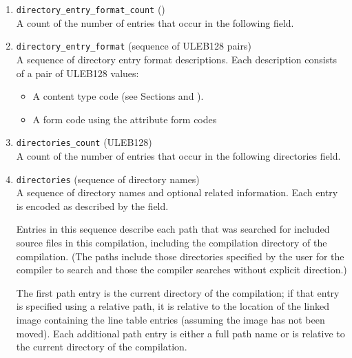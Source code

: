 \begin{enumerate}[1. ]
\setcounter{enumi}{\value{saveenumi}}
\item \texttt{directory\_entry\_format\_count} (\HFTubyte) \\
    A count of the number of entries that occur in the
    following  field.

\item \texttt{directory\_entry\_format} (sequence of ULEB128 pairs) \\
    A sequence of directory entry format descriptions.
    Each description consists of a pair of ULEB128 values:
\begin{itemize}
\setlength{\itemsep}{0em}
\item A content type code (see 
Sections  and
).

\item A form code using the attribute form codes
\end{itemize}

\item \texttt{directories\_count} (ULEB128) \\
A count of the number of entries that occur in the
following directories field.

\item \texttt{directories} (sequence of directory names) \\
A sequence of directory names and optional related
information. Each entry is encoded as described
by the  field.
   
Entries in this sequence describe each path that was
searched for included source files in this compilation,
including the compilation directory of the compilation.
(The paths include those directories specified by the
user for the compiler to search and those the compiler
searches without explicit direction.)
   
The first 
\bb
path
\eb
entry is the current directory of the compilation;
\bb
if that entry is specified using a relative path, it is relative 
to the location of the linked image containing the line table
entries (assuming the image has not been moved).
\eb
Each additional path entry is either a full path name or
is relative to the current directory of the compilation.
   

\end{enumerate}
